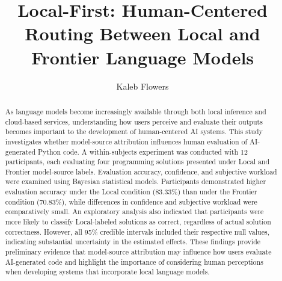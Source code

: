 \documentclass[manuscript,review]{acmart}
\begin{document}
\title{Local-First: Human-Centered  Routing Between Local and Frontier Language Models}

\author{Kaleb Flowers}

\renewcommand{\shortauthors}{Flowers}

\begin{abstract}
As language models become increasingly available through both local inference and cloud-based services, understanding how users perceive and evaluate their outputs becomes important to the development of human-centered AI systems. This study investigates whether model-source attribution influences human evaluation of AI-generated Python code. A within-subjects experiment was conducted with 12 participants, each evaluating four programming solutions presented under Local and Frontier model-source labels. Evaluation accuracy, confidence, and subjective workload were examined using Bayesian statistical models. Participants demonstrated higher evaluation accuracy under the Local condition (83.33\%) than under the Frontier condition (70.83\%), while differences in confidence and subjective workload were comparatively small. An exploratory analysis also indicated that participants were more likely to classify Local-labeled solutions as correct, regardless of actual solution correctness. However, all 95\% credible intervals included their respective null values, indicating substantial uncertainty in the estimated effects. These findings provide preliminary evidence that model-source attribution may influence how users evaluate AI-generated code and highlight the importance of considering human perceptions when developing systems that incorporate local language models.
\end{abstract}
\end{document}
